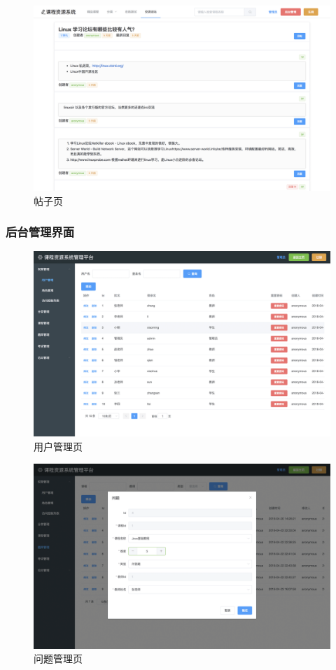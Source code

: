 \documentclass[titlepage,UTF8,linespread=1.5]{ctexart}
\begin{document}
\begin{figure}[H]
    \centering
    \includegraphics[width=140mm]{view-topic.png}
    \caption{帖子页}
    \label{fig:view-topic}
\end{figure}

\subsubsection{后台管理界面}
\begin{figure}[H]
    \centering
    \includegraphics[width=140mm]{view-user-admin.png}
    \caption{用户管理页}
    \label{fig:view-user-admin}
\end{figure}
\begin{figure}[H]
    \centering
    \includegraphics[width=140mm]{view-question-admin.png}
    \caption{问题管理页}
    \label{fig:view-question-admin}
\end{figure}
\end{document}
